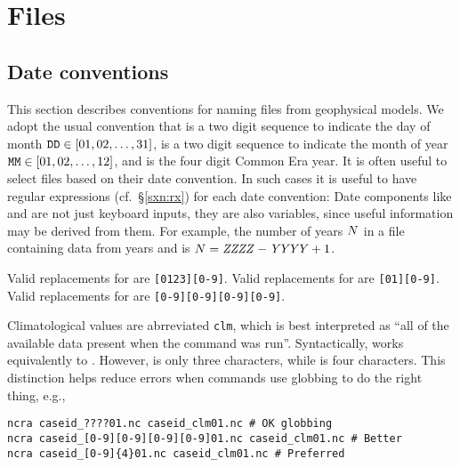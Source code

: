 \documentclass[12pt,twoside]{article}
\begin{document}
\clearpage
\section{Files}\label{sxn:fl}

\subsection{Date conventions}\label{sxn:cnv}
This section describes conventions for naming files from geophysical
models. 
We adopt the usual convention that  is a two digit sequence
to indicate the day of month $\kbdidx{DD} \in [01, 02, \ldots, 31]$,
 is a two digit sequence to indicate the month of year 
$\kbdidx{MM} \in [01, 02, \ldots, 12]$, and  is the four
digit Common Era year.
It is often useful to select files based on their date convention.
In such cases it is useful to have regular expressions
(cf.~\S\ref{sxn:rx}) for each date convention:
Date components like  and  are not just
keyboard inputs, they are also variables, since useful information
may be derived from them. 
For example, the number of years $N$ in a file containing
data from years  and  is 
$\NNN = \mbox{\varprn{ZZZZ}}-\mbox{\varprn{YYYY}}+1$.

Valid replacements for  are \verb'[0123][0-9]'.
Valid replacements for  are \verb'[01][0-9]'.
Valid replacements for  are \verb'[0-9][0-9][0-9][0-9]'.

Climatological values are abrreviated \verb'clm', which is best
interpreted as ``all of the available data present when the command 
was run''.
Syntactically,  works equivalently to .
However,  is only three characters, while  is 
four characters.        
This distinction helps reduce errors when commands use globbing
to do the right thing, e.g.,
\begin{verbatim}
ncra caseid_????01.nc caseid_clm01.nc # OK globbing
ncra caseid_[0-9][0-9][0-9][0-9]01.nc caseid_clm01.nc # Better
ncra caseid_[0-9]{4}01.nc caseid_clm01.nc # Preferred
\end{verbatim}
\end{document}
